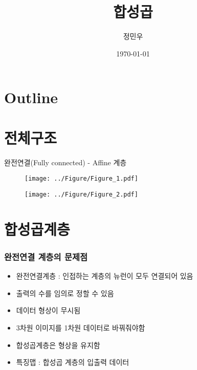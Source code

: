 \documentclass{beamer}
\begin{document}
\begin{frame}
	\title{합성곱}
	\author{정민우}
	\date{\today}
	\titlepage
\end{frame}



\section*{Outline}
\begin{frame}
\tableofcontents
\end{frame}



\section{전체구조}
\begin{frame}
	완전연결(Fully connected) - Affine 계층
	\begin{figure}
		\texttt{[image: ../Figure/Figure\_1.pdf]}
	\end{figure}
	\begin{figure}
		\texttt{[image: ../Figure/Figure\_2.pdf]}
	\end{figure}	
\end{frame}

\section{합성곱계층}

\begin{frame}
	\frametitle{완전연결 계층의 문제점}
	\begin{itemize}
		\item 완전연결계층 : 인접하는 계층의 뉴런이 모두 연결되어 있음
		\item 출력의 수를 임의로 정할 수 있음
		\item 데이터 형상이 무시됨
		\item 3차원 이미지를 1차원 데이터로 바꿔줘야함
		\item 합성곱계층은 형상을 유지함
		\item 특징맵 : 합성곱 계층의 입출력 데이터
	\end{itemize}
\end{frame}
\end{document}

